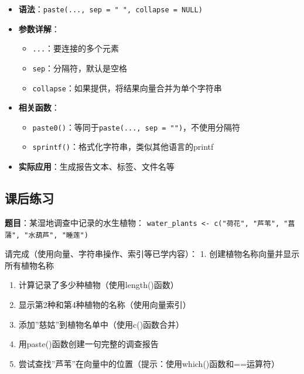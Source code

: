\documentclass[
]{book}
\providecommand{\tightlist}{%
  \setlength{\itemsep}{0pt}\setlength{\parskip}{0pt}}
\begin{document}
\begin{itemize}
\tightlist
\item
  \textbf{语法}：\texttt{paste(...,\ sep\ =\ "\ ",\ collapse\ =\ NULL)}
\item
  \textbf{参数详解}：

  \begin{itemize}
  \tightlist
  \item
    \texttt{...}：要连接的多个元素
  \item
    \texttt{sep}：分隔符，默认是空格
  \item
    \texttt{collapse}：如果提供，将结果向量合并为单个字符串
  \end{itemize}
\item
  \textbf{相关函数}：

  \begin{itemize}
  \tightlist
  \item
    \texttt{paste0()}：等同于\texttt{paste(...,\ sep\ =\ "")}，不使用分隔符
  \item
    \texttt{sprintf()}：格式化字符串，类似其他语言的printf
  \end{itemize}
\item
  \textbf{实际应用}：生成报告文本、标签、文件名等
\end{itemize}

\hypertarget{ux8bfeux540eux7ec3ux4e60-1}{%
\subsection{课后练习}\label{ux8bfeux540eux7ec3ux4e60-1}}

\textbf{题目}：某湿地调查中记录的水生植物：
\texttt{water\_plants\ \textless{}-\ c("荷花",\ "芦苇",\ "菖蒲",\ "水葫芦",\ "睡莲")}

请完成（使用向量、字符串操作、索引等已学内容）：
1. 创建植物名称向量并显示所有植物名称

\begin{enumerate}
\def\labelenumi{\arabic{enumi}.}
\setcounter{enumi}{1}
\item
  计算记录了多少种植物（使用length()函数）
\item
  显示第2种和第4种植物的名称（使用向量索引）
\item
  添加''慈姑''到植物名单中（使用c()函数合并）
\item
  用paste()函数创建一句完整的调查报告
\item
  尝试查找''芦苇''在向量中的位置（提示：使用which()函数和==运算符）
\end{enumerate}
\end{document}
